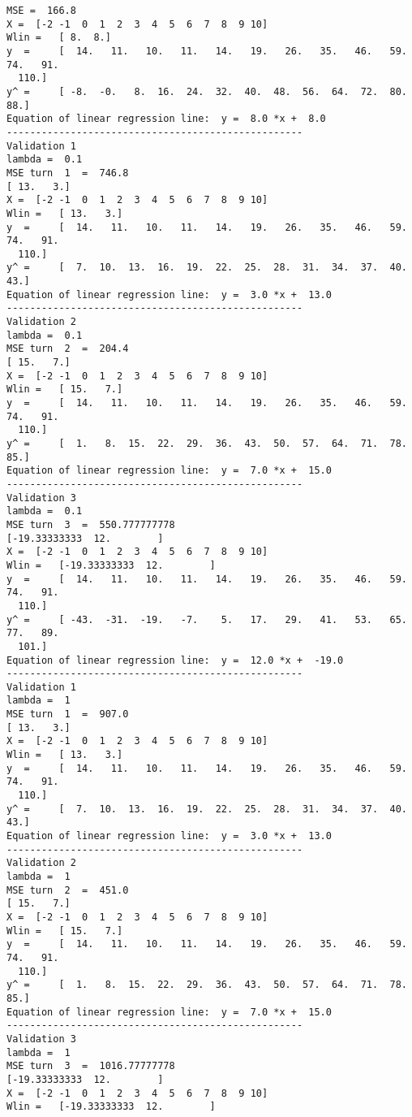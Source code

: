 \documentclass{article}
\begin{document}
\begin{lstlisting}[breaklines=true,basicstyle=\small]MSE =  166.8
X =	 [-2 -1  0  1  2  3  4  5  6  7  8  9 10]
Wlin =	 [ 8.  8.]
y  =	 [  14.   11.   10.   11.   14.   19.   26.   35.   46.   59.   74.   91.
  110.]
y^ =	 [ -8.  -0.   8.  16.  24.  32.  40.  48.  56.  64.  72.  80.  88.]
Equation of linear regression line:  y =  8.0 *x +  8.0
---------------------------------------------------
Validation 1
lambda =  0.1
MSE turn  1  =  746.8
[ 13.   3.]
X =	 [-2 -1  0  1  2  3  4  5  6  7  8  9 10]
Wlin =	 [ 13.   3.]
y  =	 [  14.   11.   10.   11.   14.   19.   26.   35.   46.   59.   74.   91.
  110.]
y^ =	 [  7.  10.  13.  16.  19.  22.  25.  28.  31.  34.  37.  40.  43.]
Equation of linear regression line:  y =  3.0 *x +  13.0
---------------------------------------------------
Validation 2
lambda =  0.1
MSE turn  2  =  204.4
[ 15.   7.]
X =	 [-2 -1  0  1  2  3  4  5  6  7  8  9 10]
Wlin =	 [ 15.   7.]
y  =	 [  14.   11.   10.   11.   14.   19.   26.   35.   46.   59.   74.   91.
  110.]
y^ =	 [  1.   8.  15.  22.  29.  36.  43.  50.  57.  64.  71.  78.  85.]
Equation of linear regression line:  y =  7.0 *x +  15.0
---------------------------------------------------
Validation 3
lambda =  0.1
MSE turn  3  =  550.777777778
[-19.33333333  12.        ]
X =	 [-2 -1  0  1  2  3  4  5  6  7  8  9 10]
Wlin =	 [-19.33333333  12.        ]
y  =	 [  14.   11.   10.   11.   14.   19.   26.   35.   46.   59.   74.   91.
  110.]
y^ =	 [ -43.  -31.  -19.   -7.    5.   17.   29.   41.   53.   65.   77.   89.
  101.]
Equation of linear regression line:  y =  12.0 *x +  -19.0
---------------------------------------------------
Validation 1
lambda =  1
MSE turn  1  =  907.0
[ 13.   3.]
X =	 [-2 -1  0  1  2  3  4  5  6  7  8  9 10]
Wlin =	 [ 13.   3.]
y  =	 [  14.   11.   10.   11.   14.   19.   26.   35.   46.   59.   74.   91.
  110.]
y^ =	 [  7.  10.  13.  16.  19.  22.  25.  28.  31.  34.  37.  40.  43.]
Equation of linear regression line:  y =  3.0 *x +  13.0
---------------------------------------------------
Validation 2
lambda =  1
MSE turn  2  =  451.0
[ 15.   7.]
X =	 [-2 -1  0  1  2  3  4  5  6  7  8  9 10]
Wlin =	 [ 15.   7.]
y  =	 [  14.   11.   10.   11.   14.   19.   26.   35.   46.   59.   74.   91.
  110.]
y^ =	 [  1.   8.  15.  22.  29.  36.  43.  50.  57.  64.  71.  78.  85.]
Equation of linear regression line:  y =  7.0 *x +  15.0
---------------------------------------------------
Validation 3
lambda =  1
MSE turn  3  =  1016.77777778
[-19.33333333  12.        ]
X =	 [-2 -1  0  1  2  3  4  5  6  7  8  9 10]
Wlin =	 [-19.33333333  12.        ]

\end{lstlisting}
\end{document}
